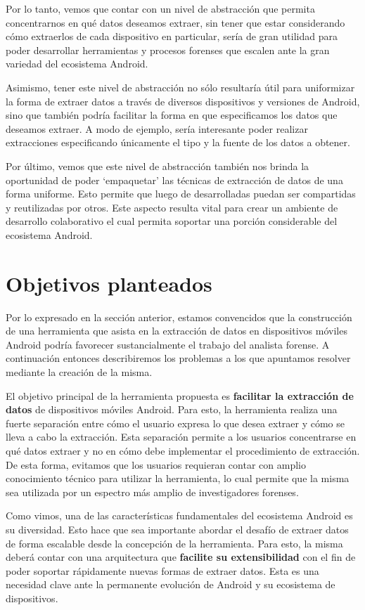 Por lo tanto, vemos que contar con un nivel de abstracción que permita concentrarnos en qué datos deseamos extraer, sin tener que estar considerando cómo extraerlos de cada dispositivo en particular, sería de gran utilidad para poder desarrollar herramientas y procesos forenses que escalen ante la gran variedad del ecosistema Android.

Asimismo, tener este nivel de abstracción no sólo resultaría útil para uniformizar la forma de extraer datos a través de diversos dispositivos y versiones de Android, sino que también podría facilitar la forma en que especificamos los datos que deseamos extraer. A modo de ejemplo, sería interesante poder realizar extracciones especificando únicamente el tipo y la fuente de los datos a obtener.

Por último, vemos que este nivel de abstracción también nos brinda la oportunidad de poder \enquote*{empaquetar} las técnicas de extracción de datos de una forma uniforme. Esto permite que luego de desarrolladas puedan ser compartidas y reutilizadas por otros. Este aspecto resulta vital para crear un ambiente de desarrollo colaborativo el cual permita soportar una porción considerable del ecosistema Android.

\section{Objetivos planteados}
Por lo expresado en la sección anterior, estamos convencidos que la construcción de una herramienta que asista en la extracción de datos en dispositivos móviles Android podría favorecer sustancialmente el trabajo del analista forense. A continuación entonces describiremos los problemas a los que apuntamos resolver mediante la creación de la misma.

El objetivo principal de la herramienta propuesta es \textbf{facilitar la extracción de datos} de dispositivos móviles Android. Para esto, la herramienta realiza una fuerte separación entre cómo el usuario expresa lo que desea extraer y cómo se lleva a cabo la extracción. Esta separación permite a los usuarios concentrarse en qué datos extraer y no en cómo debe implementar el procedimiento de extracción. De esta forma, evitamos que los usuarios requieran contar con amplio conocimiento técnico para utilizar la herramienta, lo cual permite que la misma sea utilizada por un espectro más amplio de investigadores forenses.

Como vimos, una de las características fundamentales del ecosistema Android es su diversidad. Esto hace que sea importante abordar el desafío de extraer datos de forma escalable desde la concepción de la herramienta. Para esto, la misma deberá contar con una arquitectura que \textbf{facilite su extensibilidad} con el fin de poder soportar rápidamente nuevas formas de extraer datos. Esta es una necesidad clave ante la permanente evolución de Android y su ecosistema de dispositivos.

